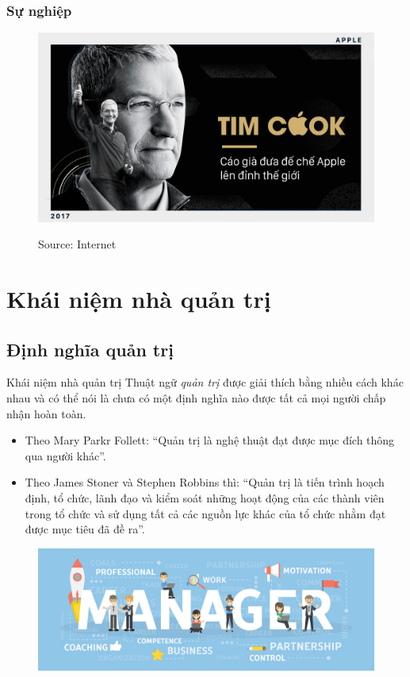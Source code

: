 \documentclass[10pt]{beamer}
\begin{document}
\begin{frame}
\transsplitverticalout
\frametitle{Sự nghiệp}

\begin{figure}
\centering
\includegraphics[scale=0.15]{Figs/timcook.jpg}

Source: Internet
\end{figure}
\end{frame}



\section{Khái niệm nhà quản trị}

\subsection{Định nghĩa quản trị}
\begin{frame}{Khái niệm nhà quản trị}
\transsplitverticalout
\pause
Thuật ngữ \emph{quản trị} được giải thích bằng nhiều cách khác nhau và có thể nói là chưa có một định nghĩa nào được tất cả mọi người chấp nhận hoàn toàn.
\pause
\begin{itemize}
\item Theo Mary Parkr Follett: “Quản trị là nghệ thuật đạt được mục đích thông qua người khác”.
\pause
\item Theo James Stoner và Stephen Robbins thì: “Quản trị là tiến trình hoạch định, tổ chức, lãnh đạo và kiểm soát những hoạt động của các thành viên trong tổ chức và sử dụng tất cả các nguồn lực khác của tổ chức nhằm đạt được mục tiêu đã đề ra”.
\end{itemize}

\begin{figure}
\includegraphics[scale=0.14]{Figs/fig3}
\end{figure}

\end{frame}
\end{document}

